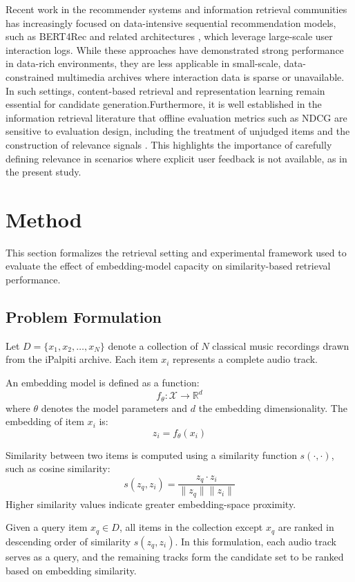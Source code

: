 \documentclass[sigconf]{acmart}
\begin{document}
Recent work in the recommender systems and information retrieval communities has increasingly focused on data-intensive sequential recommendation models, such as BERT4Rec and related architectures \cite{sun2019bert4rec}, which leverage large-scale user interaction logs. While these approaches have demonstrated strong performance in data-rich environments, they are less applicable in small-scale, data-constrained multimedia archives where interaction data is sparse or unavailable. In such settings, content-based retrieval and representation learning remain essential for candidate generation.Furthermore, it is well established in the information retrieval literature that offline evaluation metrics such as NDCG are sensitive to evaluation design, including the treatment of unjudged items and the construction of relevance signals \cite{yilmaz2008}. This highlights the importance of carefully defining relevance in scenarios where explicit user feedback is not available, as in the present study.


\section{Method}\label{sec:method}\label{ch:problem}\label{ch:methodology}
This section formalizes the retrieval setting and experimental framework used to evaluate the effect of embedding-model capacity on similarity-based retrieval performance.

\subsection{Problem Formulation}

Let $D = \{x_1, x_2, \dots, x_N\}$ denote a collection of $N$ classical music recordings drawn from
the iPalpiti archive. Each item $x_i$ represents a complete audio track.

An embedding model is defined as a function:
\[
f_\theta : \mathcal{X} \rightarrow \mathbb{R}^d
\]
where $\theta$ denotes the model parameters and $d$ the embedding dimensionality. The embedding of
item $x_i$ is:
\[
z_i = f_\theta(x_i)
\]

Similarity between two items is computed using a similarity function $s(\cdot,\cdot)$, such as cosine
similarity:
\[
s(z_q, z_i) = \frac{z_q \cdot z_i}{\|z_q\|\|z_i\|}
\]
Higher similarity values indicate greater embedding-space proximity.

Given a query item $x_q \in D$, all items in the collection except $x_q$ are ranked in descending
order of similarity $s(z_q, z_i)$. In this formulation, each audio track serves as a query, and the remaining tracks form the candidate set to be ranked based on embedding similarity. 
\end{document}
